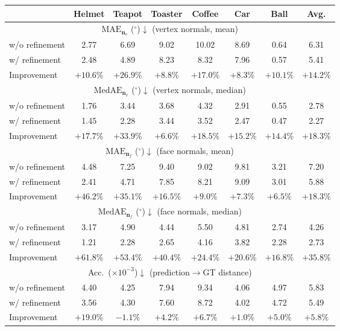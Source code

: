 \begin{table}[t]
\begin{tabular}{l ccccccc}
\toprule
& Helmet & Teapot & Toaster & Coffee & Car & Ball & Avg. \\
\midrule
\multicolumn{8}{c}{$\mathrm{MAE}_{\mathbf{n}_v}$ ($^\circ$)$\downarrow$ \quad (vertex normals, mean)} \\
\midrule
w/o refinement & 2.77 & 6.69 & 9.02 & 10.02 & 8.69 & 0.64 & 6.31 \\
w/ refinement  & 2.48 & 4.89 & 8.23 & 8.32  & 7.96 & 0.57 & 5.41 \\
\cmidrule(lr){1-8}
Improvement & $+10.6\%$ & $+26.9\%$ & $+8.8\%$ & $+17.0\%$ & $+8.3\%$ & $+10.1\%$ & $+14.2\%$ \\
\midrule
\multicolumn{8}{c}{$\mathrm{MedAE}_{\mathbf{n}_v}$ ($^\circ$)$\downarrow$ \quad (vertex normals, median)} \\
\midrule
w/o refinement & 1.76 & 3.44 & 3.68 & 4.32 & 2.91 & 0.55 & 2.78 \\
w/ refinement  & 1.45 & 2.28 & 3.44 & 3.52 & 2.47 & 0.47 & 2.27 \\
\cmidrule(lr){1-8}
Improvement & $+17.7\%$ & $+33.9\%$ & $+6.6\%$ & $+18.5\%$ & $+15.2\%$ & $+14.4\%$ & $+18.3\%$ \\
\midrule
\multicolumn{8}{c}{$\mathrm{MAE}_{\mathbf{n}_f}$ ($^\circ$)$\downarrow$ \quad (face normals, mean)} \\
\midrule
w/o refinement & 4.48 & 7.25 & 9.40 & 9.02 & 9.81 & 3.21 & 7.20 \\
w/ refinement  & 2.41 & 4.71 & 7.85 & 8.21 & 9.09 & 3.01 & 5.88 \\
\cmidrule(lr){1-8}
Improvement & $+46.2\%$ & $+35.1\%$ & $+16.5\%$ & $+9.0\%$ & $+7.3\%$ & $+6.5\%$ & $+18.3\%$ \\
\midrule
\multicolumn{8}{c}{$\mathrm{MedAE}_{\mathbf{n}_f}$ ($^\circ$)$\downarrow$ \quad (face normals, median)} \\
\midrule
w/o refinement & 3.17 & 4.90 & 4.44 & 5.50 & 4.81 & 2.74 & 4.26 \\
w/ refinement  & 1.21 & 2.28 & 2.65 & 4.16 & 3.82 & 2.28 & 2.73 \\
\cmidrule(lr){1-8}
Improvement & $+61.8\%$ & $+53.4\%$ & $+40.4\%$ & $+24.4\%$ & $+20.6\%$ & $+16.8\%$ & $+35.8\%$ \\
\midrule
\multicolumn{8}{c}{Acc.\ ($\times10^{-3}$)$\downarrow$ \quad (prediction$\rightarrow$GT distance)} \\
\midrule
w/o refinement & 4.40 & 4.25 & 7.94 & 9.34 & 4.06 & 4.97 & 5.83 \\
w/ refinement  & 3.56 & 4.30 & 7.60 & 8.72 & 4.02 & 4.72 & 5.49 \\
\cmidrule(lr){1-8}
Improvement & $+19.0\%$ & \cellcolor{red!15} $-1.1\%$ & $+4.2\%$ & $+6.7\%$ & $+1.0\%$ & $+5.0\%$ & $+5.8\%$ \\
\bottomrule
\end{tabular}
\end{table}